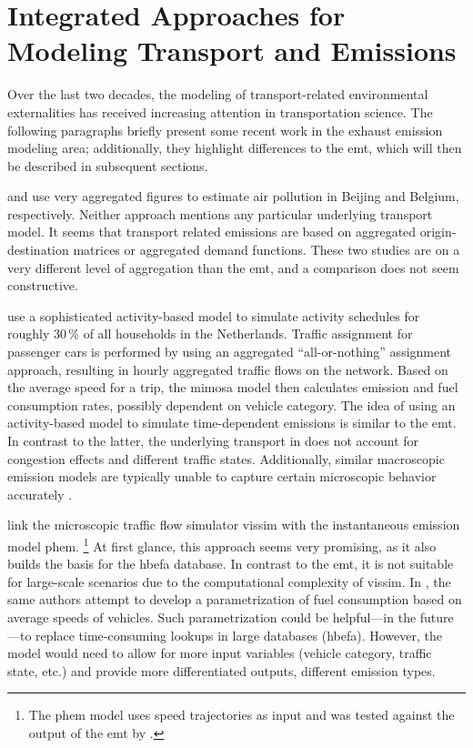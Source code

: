 \section{Integrated Approaches for Modeling Transport and Emissions}
\label{ch:emissions:relatedWork}
%
Over the last two decades, the modeling of transport-related environmental 
externalities has received increasing attention in transportation science.
%
The following paragraphs briefly present some recent 
work in the exhaust emission modeling area; additionally, they 
highlight differences to the \gls{emt}, which will then be described in 
subsequent sections.

\citet{CreutzigHe_TransResD_2009} and \citet{MichielsEtAl_TransResD_2012} use very 
aggregated figures to estimate air pollution in Beijing and Belgium, 
respectively. Neither approach mentions any particular underlying 
transport model. It seems that transport related emissions are based on
aggregated origin-destination matrices or aggregated demand functions. These 
two studies are on a very different level of aggregation than the \gls{emt}, and a comparison does not seem constructive.

\citet{BeckxEtAl_EnvPlannB_2009} use a sophisticated 
activity-based model to simulate activity schedules for roughly 30\,\% of all 
households in the Netherlands. Traffic assignment for passenger cars is 
performed by using an aggregated ``all-or-nothing'' assignment approach, 
resulting in hourly aggregated traffic flows on the network. Based on the 
average speed for a trip, the \acrshort{mimosa} model then 
calculates emission and fuel consumption rates, possibly dependent on vehicle 
category. The idea of using an activity-based model to simulate 
time-dependent emissions is similar to the \gls{emt}. In contrast to the 
latter, the underlying transport in \citet{BeckxEtAl_EnvPlannB_2009} 
does not account for congestion effects and different traffic states. 
Additionally, similar macroscopic emission models are typically unable to 
capture certain microscopic behavior accurately 
\citep[see, e.g.,][]{AhnRakha_TransResD_2008}. 

\citet{HirschmannEtAl_ITSC_2010} link the microscopic traffic flow simulator \acrshort{vissim} with the instantaneous emission model \acrshort{phem}.%
%
\footnote{
%
The \acrshort{phem} model uses speed trajectories as input and was tested against the output of the \gls{emt} by \citet{HuelsmannEtAl_LAS_2011}.
%
}
%
At first glance, this approach seems very promising, as it also builds the 
basis for the \gls{hbefa} database. In contrast to the \gls{emt}, it is not 
suitable for large-scale scenarios due to the computational complexity of 
\acrshort{vissim}.
%
In \citet{Kraschl-HirschmannEtAl_FISTS_2011}, the same authors attempt to 
develop a parametrization of fuel consumption based on average speeds of 
vehicles. Such parametrization could be helpful---in the future---to replace 
time-consuming lookups in large databases (\eg \gls{hbefa}). However, the 
model would need to allow for more input variables (\eg vehicle category, 
traffic state, etc.) and provide more differentiated outputs, \eg 
different emission types.

